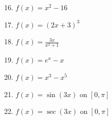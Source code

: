 \documentclass[12pt]{article}
\newif\ifans
\begin{document}
\begin{enumerate}
\setcounter{enumi}{15}

\item $f(x) = x^2-16$ 

\ifans{\fbox{Relative min at $(0,-16)$}} \fi

\item $f(x) = (2x+3)^3$ 

\ifans{\fbox{Critical Point at $-\frac{3}{2}$, No relative extrema}} \fi

\item $f(x) = \frac{3x}{x^2+1}$ 

\ifans{\fbox{Relative max at $\left(1,\frac{3}{2}\right)$; Relative min at $\left(-1,-\frac{3}{2}\right)$}} \fi

\item $f(x) = e^x-x$ 

\ifans{\fbox{Relative max at $(0,1)$}} \fi

\item $f(x) = x^3-x^5$ 

\ifans{\fbox{\parbox{1\linewidth}{
Relative maximum at $\left(\sqrt{\frac{3}{5}},\left(\frac{2}{5}\right) \cdot \left(\frac{3}{5}\right)^{3/2}\right)$\\
Relative minimum at $\left(-\sqrt{\frac{3}{5}},-\left(\frac{2}{5}\right) \cdot \left(\frac{3}{5}\right)^{3/2}\right)$\\
Critical point at $(0,0)$, which is neither a relative max nor a relative min}}} \fi

\end{enumerate}


\begin{enumerate}
\setcounter{enumi}{20}

\item $f(x) = \sin{(3x)}$ on $[0,\pi]$ 

\ifans{\fbox{Relative maxima at $\left(\frac{\pi}{6},1\right)$ and $\left(\frac{5\pi}{6},1\right)$; Relative minimum at $\left(\frac{\pi}{2},-1\right)$}} \fi

\item $f(x) = \sec{(3x)}$ on $[0,\pi]$ 

\ifans{\fbox{Relative minima at $(0,1)$ and $\left(\frac{2\pi}{3},1\right)$; Relative maxima at $\left(\frac{\pi}{3},-1\right)$ and $(\pi,-1)$}} \fi

\end{enumerate}
\end{document}
